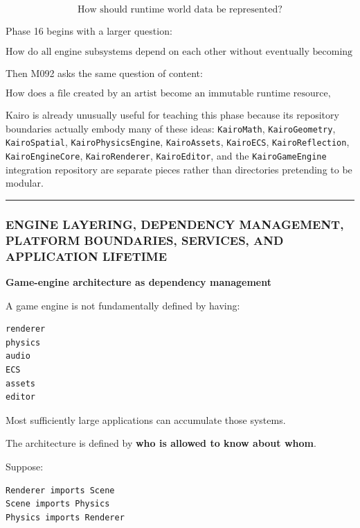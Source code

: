 \[
\text{How should runtime world data be represented?}
\]

Phase 16 begins with a larger question:

\[
\boxed{
\text{How do all engine subsystems depend on each other without eventually becoming one inseparable program?}
}
\]

Then M092 asks the same question of content:

\[
\boxed{
\text{How does a file created by an artist become an immutable runtime resource,
while remaining reproducible, reloadable, cacheable and safe for the GPU?}
}
\]

Kairo is already unusually useful for teaching this phase because its repository boundaries actually embody many of these ideas: \texttt{KairoMath}, \texttt{KairoGeometry}, \texttt{KairoSpatial}, \texttt{KairoPhysicsEngine}, \texttt{KairoAssets}, \texttt{KairoECS}, \texttt{KairoReflection}, \texttt{KairoEngineCore}, \texttt{KairoRenderer}, \texttt{KairoEditor}, and the \texttt{KairoGameEngine} integration repository are separate pieces rather than directories pretending to be modular.

\begin{center}\rule{0.5\linewidth}{0.5pt}\end{center}

\subsubsection{ENGINE LAYERING, DEPENDENCY MANAGEMENT, PLATFORM BOUNDARIES, SERVICES, AND APPLICATION LIFETIME}\label{engine-layering-dependency-management-platform-boundaries-services-and-application-lifetime}

\textbf{Game-engine architecture as dependency management}

A game engine is not fundamentally defined by having:

\begin{verbatim}
renderer
physics
audio
ECS
assets
editor
\end{verbatim}

Most sufficiently large applications can accumulate those systems.

The architecture is defined by \textbf{who is allowed to know about whom}.

Suppose:

\begin{verbatim}
Renderer imports Scene
Scene imports Physics
Physics imports Renderer
\end{verbatim}

